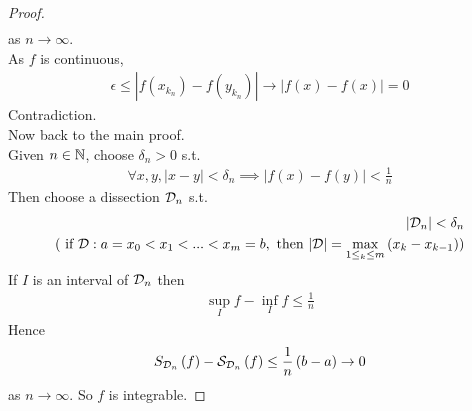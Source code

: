 \documentclass[a4paper]{article}
\begin{document}
\begin{thm}
\begin{proof}
\begin{equation*}
\begin{aligned}
\end{aligned}
\end{equation*}
as $n\to \infty$.\\
As $f$ is continuous, 
\begin{equation*}
\begin{aligned}
\epsilon\leq|f\left(x_{k_n}\right) - f\left(y_{k_n}\right)| \to |f\left(x\right) - f\left(x\right)| = 0
\end{aligned}
\end{equation*}
Contradiction.\\
Now back to the main proof.\\
Given $n\in \mathbb{N}$, choose $\delta_n > 0$ s.t.
\begin{equation*}
\begin{aligned}
\forall x,y, |x-y|<\delta_n \implies |f\left(x\right) - f\left(y\right) | < \frac{1}{n}
\end{aligned}
\end{equation*}
Then choose a dissection $\mathcal{D}_n$ s.t.
\begin{equation*}
\begin{aligned}
|\mathcal{D}_n| < \delta_n\\
(\text{  if  } \mathcal{D}: a=x_0<x_1<...<x_m = b, \text{  then  } |\mathcal{D}| = \max_{1\leq_k\leq m} \left(x_k-x_{k-1}\right) )
\end{aligned}
\end{equation*}
If $I$ is an interval of $\mathcal{D}_n$ then 
\begin{equation*}
\begin{aligned}
\sup_I f - \inf_I f \leq \frac{1}{n}
\end{aligned}
\end{equation*}
Hence
\begin{equation*}
\begin{aligned}
S_{\mathcal{D}_n}\left(f\right) - \mathcal{S}_{\mathcal{D}_n} \left(f\right) \leq \frac{1}{n}\left(b-a\right) \to 0
\end{aligned}
\end{equation*}
as $n\to\infty$. So $f$ is integrable.
\end{proof}
\end{thm}
\end{document}
